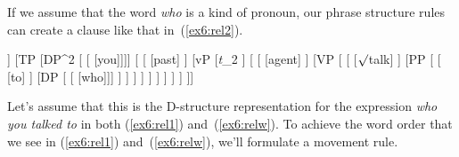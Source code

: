 If we assume that the word \emph{who} is a kind of pronoun, our phrase structure rules can create a clause like that in~(\ref{ex6:rel2}).
\begin{exe}
\raggedright
	\ex \label{ex6:rel2}
	\small
	\begin{forest}
	[CP[\ibar{C}
		[\obar{C} [??]]
		[TP 
			[DP^2 [ [ [you]]]]
			[ 
				[ [past] ]
				[vP
					[\emph{t}_2 ]
					[ 
						[ [agent] ]
						[VP [
							[ [$\surd$talk] ]
							[PP [
								[ [to] ]
								[DP [ [ [who]]] ]
							] ]
						] ]
					]
				 ]
			]
		]
	]]
	\end{forest}%
\end{exe}
Let's assume that this is the D-structure representation for the expression \emph{who you talked to} in both (\ref{ex6:rel1}) and~(\ref{ex6:relw}). To achieve the word order that we see in (\ref{ex6:rel1}) and~(\ref{ex6:relw}), we'll formulate a movement rule.


